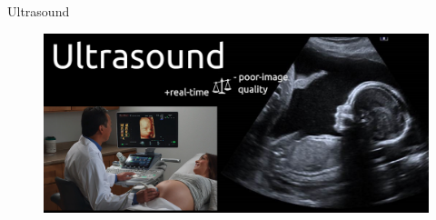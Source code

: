 {
\begin{frame}{Ultrasound}
      \begin{figure}
        \centering
        \includegraphics[width=1.0\textwidth]{./figures/medical-imaging-in-pregnancy/us/versions/drawing-v01.png}
      \end{figure}
\end{frame}
}



